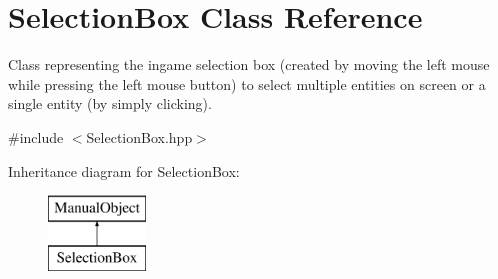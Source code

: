 \hypertarget{class_selection_box}{}\section{Selection\+Box Class Reference}
\label{class_selection_box}


Class representing the ingame selection box (created by moving the left mouse while pressing the left mouse button) to select multiple entities on screen or a single entity (by simply clicking).  




{\ttfamily \#include $<$Selection\+Box.\+hpp$>$}

Inheritance diagram for Selection\+Box\+:\begin{figure}[H]
\begin{center}
\leavevmode
\includegraphics[height=2.000000cm]{class_selection_box}
\end{center}
\end{figure}
